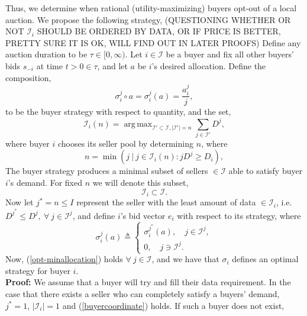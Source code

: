 \documentclass[12pt]{article}
\theoremstyle{definition}
\newcommand{\mcI}{\mathcal{I}}
\newcommand{\g}{\sigma}
\DeclareMathOperator*{\argmax}{arg\,max}
\DeclareMathOperator*{\argmin}{arg\,min}
\begin{document}
\begin{multicols}{2}
Thus, we determine when rational (utility-maximizing) buyers opt-out of a local auction. 
We propose the following strategy, 
(QUESTIONING WHETHER OR NOT $\mcI_i$ SHOULD
BE ORDERED BY DATA, OR IF PRICE IS BETTER, PRETTY SURE IT IS OK, WILL FIND OUT
IN LATER PROOFS)
{
\label{buyerstrategy}
Define any auction duration to be $\tau \in [0,\infty)$. 
Let $i\in\mcI$ be a buyer and fix all other buyers' bids $s_{-i}$ at time
$t>0\in\tau$, and let $a$ be $i$'s desired allocation. 
Define the composition,
$$
     \g_i^j \circ a = \g_i^j(a) = \frac{a_i^j}{j},
$$
to be the buyer strategy with respect to quantity, and the set,
$$
    \mcI_i(n) =\argmax_{\mcI' \subset \mcI, \vert\mcI'\vert =
n}\sum_{j\in\mcI'} D^j,
$$
where buyer $i$ chooses its seller pool by determining $n$, where
\begin{equation}\label{buyercoordinate}
    n = \min( j\ \vert\ j\in \mcI_i(n): j D^j\ge D_i),
\end{equation} 
The buyer strategy produces a minimal subset of sellers $\in \mcI$ 
able to satisfy buyer $i$'s demand. For 
fixed $n$ we will denote this subset,
\begin{equation}\label{sellers}
    \mcI_i \subset \mcI.
\end{equation}  
Now let $j^* = n \le I$ represent the seller with the least amount of data
$\in\mcI_i$, i.e. $D^{j^*} \le D^j, \ \forall\ j \in\mcI^j$, and define $i$'s bid
vector $e_i$ with respect to its strategy, where
\begin{equation}\label{opt-minallocation}
    \g_i^j(a) \triangleq \begin{cases} \g_i^{j^*}(a), \quad j\in\mcI^j,\\
            0, \quad j\ni\mcI^j.\end{cases}
\end{equation}
Now, (\ref{opt-minallocation}) holds $\forall \ j\in\mcI$,
and we have that $\g_i$ defines an optimal strategy for buyer $i$.
}\\
\textbf{Proof:}
We assume that a buyer will try and fill their data requirement.
In the case that there exists a seller who can completely satisfy a buyers'
demand, $j^*=1$, $\vert \mcI_i\vert =1$ and (\ref{buyercoordinate}) holds. If such a buyer does not exist,

\end{multicols}
\end{document}
